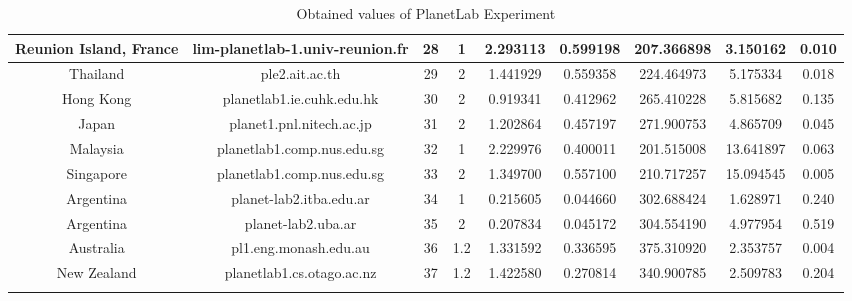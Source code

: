 \begin{center}
{\begin{longtable}{c c c c c c c c c}
        Reunion Island, France & lim-planetlab-1.univ-reunion.fr & 28 & 1  &2.293113&0.599198&207.366898&3.150162&0.010\\\hline
        Thailand & ple2.ait.ac.th                       & 29  &  2 &1.441929&0.559358&224.464973&5.175334&0.018\\\hline
        Hong Kong & planetlab1.ie.cuhk.edu.hk           & 30  &  2 &0.919341&0.412962&265.410228&5.815682&0.135\\\hline
        Japan & planet1.pnl.nitech.ac.jp                & 31  &  2 &1.202864&0.457197&271.900753&4.865709&0.045\\\hline
        Malaysia & planetlab1.comp.nus.edu.sg           & 32  &  1 &2.229976&0.400011&201.515008&13.641897&0.063\\\hline
        Singapore & planetlab1.comp.nus.edu.sg          & 33  &  2 &1.349700&0.557100&210.717257&15.094545&0.005\\\hline
        Argentina & planet-lab2.itba.edu.ar             & 34  &  1 &0.215605&0.044660&302.688424&1.628971&0.240\\\hline
        Argentina  & planet-lab2.uba.ar                 & 35  &  2 &0.207834&0.045172&304.554190&4.977954&0.519\\\hline
        Australia & pl1.eng.monash.edu.au               & 36  &1.2 &1.331592&0.336595&375.310920&2.353757&0.004\\\hline
        New Zealand & planetlab1.cs.otago.ac.nz         & 37  &1.2 &1.422580&0.270814&340.900785&2.509783&0.204\\\hline
\caption{Obtained values of PlanetLab Experiment}
\label{anex:nodes-pl-results}
\end{longtable}
}
\end{center}
